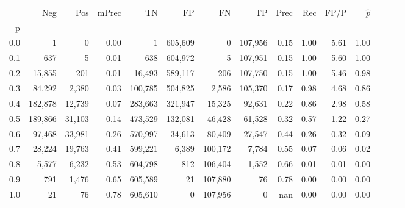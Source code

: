 \begin{tabular}{rrrrrrrrrrrrrrr}
\toprule
{} &      Neg &     Pos & mPrec &       TN &       FP &       FN &       TP &  Prec &   Rec &  FP/P & $\hat{p}$ \\
p   &          &         &       &          &          &          &          &       &       &       &           \\
\midrule
0.0 &        1 &       0 &  0.00 &        1 &  605,609 &        0 &  107,956 &  0.15 &  1.00 &  5.61 &      1.00 \\
0.1 &      637 &       5 &  0.01 &      638 &  604,972 &        5 &  107,951 &  0.15 &  1.00 &  5.60 &      1.00 \\
0.2 &   15,855 &     201 &  0.01 &   16,493 &  589,117 &      206 &  107,750 &  0.15 &  1.00 &  5.46 &      0.98 \\
0.3 &   84,292 &   2,380 &  0.03 &  100,785 &  504,825 &    2,586 &  105,370 &  0.17 &  0.98 &  4.68 &      0.86 \\
0.4 &  182,878 &  12,739 &  0.07 &  283,663 &  321,947 &   15,325 &   92,631 &  0.22 &  0.86 &  2.98 &      0.58 \\
0.5 &  189,866 &  31,103 &  0.14 &  473,529 &  132,081 &   46,428 &   61,528 &  0.32 &  0.57 &  1.22 &      0.27 \\
0.6 &   97,468 &  33,981 &  0.26 &  570,997 &   34,613 &   80,409 &   27,547 &  0.44 &  0.26 &  0.32 &      0.09 \\
0.7 &   28,224 &  19,763 &  0.41 &  599,221 &    6,389 &  100,172 &    7,784 &  0.55 &  0.07 &  0.06 &      0.02 \\
0.8 &    5,577 &   6,232 &  0.53 &  604,798 &      812 &  106,404 &    1,552 &  0.66 &  0.01 &  0.01 &      0.00 \\
0.9 &      791 &   1,476 &  0.65 &  605,589 &       21 &  107,880 &       76 &  0.78 &  0.00 &  0.00 &      0.00 \\
1.0 &       21 &      76 &  0.78 &  605,610 &        0 &  107,956 &        0 &   nan &  0.00 &  0.00 &      0.00 \\
\bottomrule
\end{tabular}
